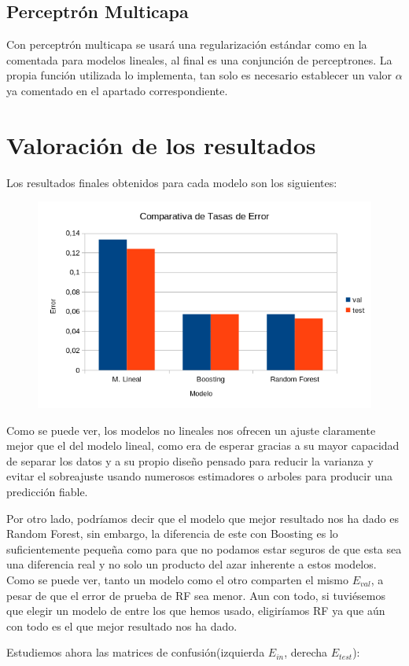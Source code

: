 \documentclass{article}
\begin{document}
	\subsection{Perceptrón Multicapa}
	Con perceptrón multicapa se usará una regularización estándar como en la comentada para modelos lineales, al final es una conjunción de perceptrones. La propia función utilizada lo implementa, tan solo es necesario establecer un valor $\alpha$ ya comentado en el apartado correspondiente.
	
	\section{Valoración de los resultados} %
	Los resultados finales obtenidos para cada modelo son los siguientes:
	\begin{figure}[H]
	  \includegraphics[width=\linewidth]{Imagenes/CE.png}
	  \label{fig:boat1}
	\end{figure}
	Como se puede ver, los modelos no lineales nos ofrecen un ajuste claramente mejor que el del modelo lineal, como era de esperar gracias a su mayor capacidad de separar los datos y a su propio diseño pensado para reducir la varianza y evitar el sobreajuste usando numerosos estimadores o arboles para producir una predicción fiable. 
	\par 
	Por otro lado, podríamos decir que el modelo que mejor resultado nos ha dado es Random Forest, sin embargo, la diferencia de este con Boosting es lo suficientemente pequeña como para que no podamos estar seguros de que esta sea una diferencia real y no solo un producto del azar inherente a estos modelos. Como se puede ver, tanto un modelo como el otro comparten el mismo $E_{val}$, a pesar de que el error de prueba de RF sea menor. Aun con todo, si tuviésemos que elegir un modelo de entre los que hemos usado, eligiríamos RF ya que aún con todo es el que mejor resultado nos ha dado.
	\par
	Estudiemos ahora las matrices de confusión(izquierda $E_{in}$, derecha ${E_{test}}$):
	
\end{document}
